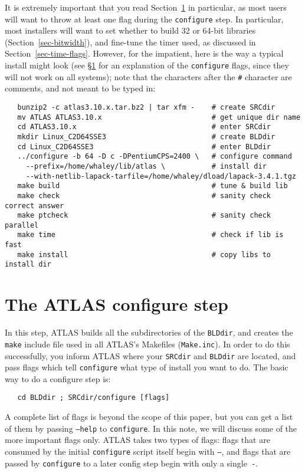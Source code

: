 \documentclass[11pt]{article}
\begin{document}
It is extremely important that you read Section~\ref{sec-configure} in 
particular, as most users will want to throw at least one flag during
the {\tt configure} step.  In particular, most installers will
want to set whether to build 32 or 64-bit libraries
(Section~\ref{sec-bitwidth}), and fine-tune the timer used, as discussed
in Section~\ref{sec-time-flags}.
However, for the impatient, here is the way a 
typical install might look (see \S\ref{sec-configure} for an explanation
of the {\tt configure} flags, since they will not work on all systems); 
note that the characters after the \verb+#+ character are comments,
and not meant to be typed in:
\begin{verbatim}
   bunzip2 -c atlas3.10.x.tar.bz2 | tar xfm -    # create SRCdir
   mv ATLAS ATLAS3.10.x                          # get unique dir name
   cd ATLAS3.10.x                                # enter SRCdir
   mkdir Linux_C2D64SSE3                         # create BLDdir
   cd Linux_C2D64SSE3                            # enter BLDdir
   ../configure -b 64 -D c -DPentiumCPS=2400 \   # configure command
     --prefix=/home/whaley/lib/atlas \           # install dir
     --with-netlib-lapack-tarfile=/home/whaley/dload/lapack-3.4.1.tgz
   make build                                    # tune & build lib
   make check                                    # sanity check correct answer
   make ptcheck                                  # sanity check parallel
   make time                                     # check if lib is fast
   make install                                  # copy libs to install dir
\end{verbatim}

\section{The ATLAS configure step}
\label{sec-configure}

In this step, ATLAS builds all the subdirectories of the {\tt BLDdir}, and
creates the {\tt make} include file used in all ATLAS's Makefiles 
({\tt Make.inc}).
In order to do this successfully, you inform ATLAS where your 
{\tt SRCdir} and {\tt BLDdir} are located, and pass flags which tell 
{\tt configure}
what type of install you want to do.  The basic way to do a configure step is:
\begin{verbatim}
   cd BLDdir ; SRCdir/configure [flags]
\end{verbatim}

A complete list of flags is beyond the
scope of this paper, but you can get a list of them by passing {\tt --help} to
{\tt configure}.  In this note, we will discuss some of the more important
flags only.  ATLAS takes two types of flags: flags that are consumed by the
initial {\tt configure} script itself begin with {\tt --}, and flags that are
passed by {\tt configure} to a later config step begin with only a 
single~{\tt -}.
\end{document}
